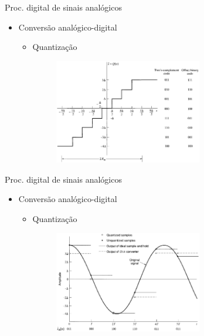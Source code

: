\begin{slide}{Proc. digital de sinais anal\'ogicos}
\begin{itemize}
   \item Conversão analógico-digital
   \begin{itemize}
      \item Quantização 
      \begin{figure}
        \centering
         \includegraphics[width = 0.65\textwidth]{figs/ad_quantz.eps}
      \end{figure}

   \end{itemize}
\end{itemize}
\end{slide}


\begin{slide}{Proc. digital de sinais anal\'ogicos}
\begin{itemize}
   \item Conversão analógico-digital
   \begin{itemize}
      \item Quantização 
      \begin{figure}
        \centering
         \includegraphics[width = 0.65\textwidth]{figs/ad_quantz2.eps}
      \end{figure}

   \end{itemize}
\end{itemize}
\end{slide}

